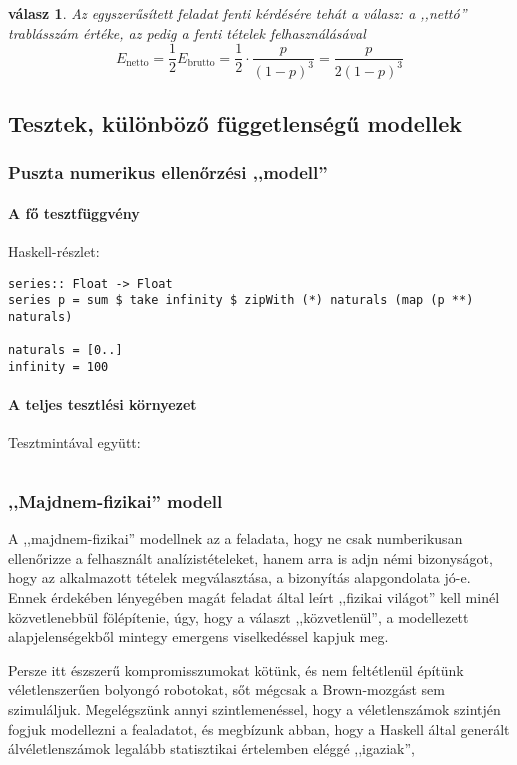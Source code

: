 \documentclass{article}
\newtheorem{answer}{válasz}
\newcommand{\parenthesed}[1]{\left(#1\right)}
\newcommand{\expvalnet}{E_{\text{netto}}}
\newcommand{\expvalgro}{E_{\text{brutto}}}
\begin{document}
	\begin{answer}
		Az egyszerűsített feladat fenti kérdésére tehát a válasz: a ,,nettó'' trablásszám értéke, az pedig a fenti tételek felhasználásával
		\begin{equation}
			\expvalnet = \frac12\expvalgro = \frac12\cdot\frac p{\parenthesed{1-p}^3} = \frac p{2\parenthesed{1-p}^3}
		\end{equation}
	\end{answer}


	\subsection{Tesztek, különböző függetlenségű modellek}

	\subsubsection{Puszta numerikus ellenőrzési ,,modell''}

	\paragraph{A fő tesztfüggvény} Haskell-részlet:


	\begin{verbatim}
series:: Float -> Float
series p = sum $ take infinity $ zipWith (*) naturals (map (p **) naturals)

naturals = [0..]
infinity = 100
	\end{verbatim}

	\paragraph{A teljes tesztlési környezet} Tesztmintával együtt:

	\inputminted{haskell}{Series.hs}

	\subsubsection{,,Majdnem-fizikai'' modell}

	A ,,majdnem-fizikai'' modellnek az a feladata, hogy ne csak numberikusan ellenőrizze a felhasznált analízistételeket,
	hanem arra is adjn némi bizonyságot, hogy az alkalmazott tételek megválasztása, a bizonyítás alapgondolata jó-e.
	Ennek érdekében lényegében magát  feladat által leírt ,,fizikai világot'' kell minél közvetlenebbül fölépítenie,
	úgy, hogy a választ ,,közvetlenül'', a modellezett alapjelenségekből mintegy emergens viselkedéssel kapjuk  meg.

	Persze itt észszerű kompromisszumokat kötünk, és nem feltétlenül építünk véletlenszerűen bolyongó robotokat, sőt mégcsak a Brown-mozgást sem szimuláljuk.
	Megelégszünk annyi szintlemenéssel, hogy a véletlenszámok szintjén fogjuk modellezni a fealadatot, és megbízunk abban, hogy a Haskell által generált álvéletlenszámok legalább statisztikai értelemben eléggé ,,igaziak'',
\end{document}
